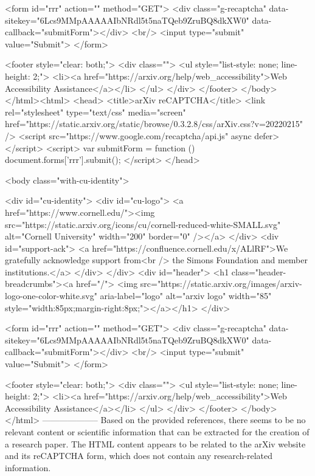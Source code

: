        <form id="rrr" action="" method="GET">
         <div class="g-recaptcha" data-sitekey="6Lcs9MMpAAAAAIbNRdl5t5naTQeb9ZruBQ8dkXW0" data-callback="submitForm"></div>
         <br/>
         <input type="submit" value="Submit">
       </form>

       <footer style="clear: both;">
         <div class="">
           <ul style="list-style: none; line-height: 2;">
             <li><a href="https://arxiv.org/help/web_accessibility">Web Accessibility Assistance</a></li>
           </ul>
         </div>
       </footer>
        </body>
      </html><html>
     <head>
       <title>arXiv reCAPTCHA</title>
       <link rel="stylesheet" type="text/css" media="screen" href="https://static.arxiv.org/static/browse/0.3.2.8/css/arXiv.css?v=20220215" />
       <script src="https://www.google.com/recaptcha/api.js" async defer></script>
       <script>
         var submitForm = function () {
             document.forms['rrr'].submit();
         }
       </script>
     </head>

     <body class="with-cu-identity">

       <div id="cu-identity">
         <div id="cu-logo">
           <a href="https://www.cornell.edu/"><img src="https://static.arxiv.org/icons/cu/cornell-reduced-white-SMALL.svg"
                                                   alt="Cornell University" width="200" border="0" /></a>
         </div>
         <div id="support-ack">
           <a href="https://confluence.cornell.edu/x/ALlRF">We gratefully acknowledge support from<br />
             the Simons Foundation and member institutions.</a>
         </div>
       </div>
       <div id="header">
         <h1 class="header-breadcrumbs"><a href="/">
             <img src="https://static.arxiv.org/images/arxiv-logo-one-color-white.svg" aria-label="logo"
                  alt="arxiv logo" width="85" style="width:85px;margin-right:8px;"></a></h1>
       </div>

       <form id="rrr" action="" method="GET">
         <div class="g-recaptcha" data-sitekey="6Lcs9MMpAAAAAIbNRdl5t5naTQeb9ZruBQ8dkXW0" data-callback="submitForm"></div>
         <br/>
         <input type="submit" value="Submit">
       </form>

       <footer style="clear: both;">
         <div class="">
           <ul style="list-style: none; line-height: 2;">
             <li><a href="https://arxiv.org/help/web_accessibility">Web Accessibility Assistance</a></li>
           </ul>
         </div>
       </footer>
        </body>
      </html>
        --------------------
         Based on the provided references, there seems to be no relevant content or scientific information that can be extracted for the creation of a research paper. The HTML content appears to be related to the arXiv website and its reCAPTCHA form, which does not contain any research-related information.

